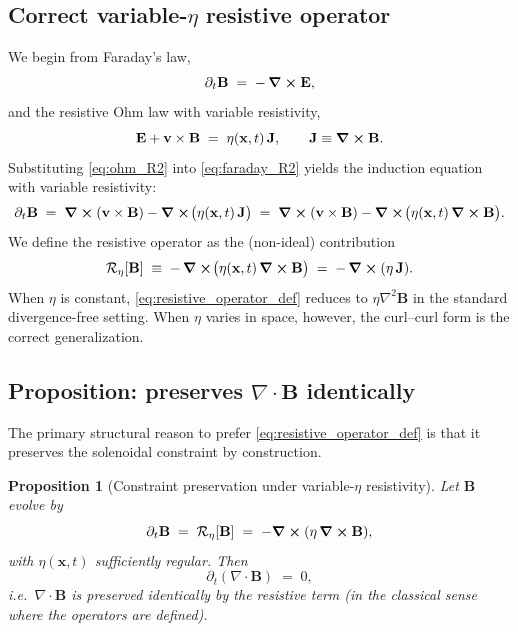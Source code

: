 \documentclass[11pt]{article}
\theoremstyle{plain}
\newtheorem{proposition}{Proposition}
\theoremstyle{definition}
\theoremstyle{remark}
\newcommand{\diver}{\nabla\cdot}
\newcommand{\B}{\mathbf{B}}
\newcommand{\E}{\mathbf{E}}
\newcommand{\J}{\mathbf{J}}
\newcommand{\vfield}{\mathbf{v}}
\begin{document}
\subsection{Correct variable-$\eta$ resistive operator}\label{sec:result_vector_operator}
We begin from Faraday's law,
\begin{equation}\label{eq:faraday_R2}
  \partial_t \B \;=\; -\,\curl \E,
\end{equation}
and the resistive Ohm law with variable resistivity,
\begin{equation}\label{eq:ohm_R2}
  \E + \vfield\times\B \;=\; \eta(\mathbf{x},t)\,\J,
  \qquad \J \equiv \curl\B.
\end{equation}
Substituting \eqref{eq:ohm_R2} into \eqref{eq:faraday_R2} yields the induction equation with variable
resistivity:
\begin{equation}\label{eq:induction_variable_eta_R2}
  \partial_t \B
  \;=\;
  \curl(\vfield\times\B) - \curl\!\big(\eta(\mathbf{x},t)\,\J\big)
  \;=\;
  \curl(\vfield\times\B) - \curl\!\big(\eta(\mathbf{x},t)\,\curl\B\big).
\end{equation}
We define the resistive operator as the (non-ideal) contribution
\begin{equation}\label{eq:resistive_operator_def}
  \mathcal{R}_{\eta}[\B]
  \;\equiv\;
  -\,\curl\!\big(\eta(\mathbf{x},t)\,\curl\B\big)
  \;=\;
  -\,\curl(\eta\,\J).
\end{equation}
When $\eta$ is constant, \eqref{eq:resistive_operator_def} reduces to $\eta\nabla^2\B$ in the standard
divergence-free setting. When $\eta$ varies in space, however, the curl--curl form is the correct
generalization.

\subsection{Proposition: preserves $\diver\B$ identically}\label{sec:result_vector_divB}
The primary structural reason to prefer \eqref{eq:resistive_operator_def} is that it preserves the
solenoidal constraint by construction.

\begin{proposition}[Constraint preservation under variable-$\eta$ resistivity]\label{prop:divB_preserve}
Let $\B$ evolve by
\begin{equation}\label{eq:B_res_only}
  \partial_t \B \;=\; \mathcal{R}_{\eta}[\B] \;=\; -\curl(\eta\,\curl\B),
\end{equation}
with $\eta(\mathbf{x},t)$ sufficiently regular. Then
\begin{equation}\label{eq:divB_preserve}
  \partial_t(\diver\B) \;=\; 0,
\end{equation}
i.e.\ $\diver\B$ is preserved identically by the resistive term (in the classical sense where the
operators are defined).
\end{proposition}
\end{document}
